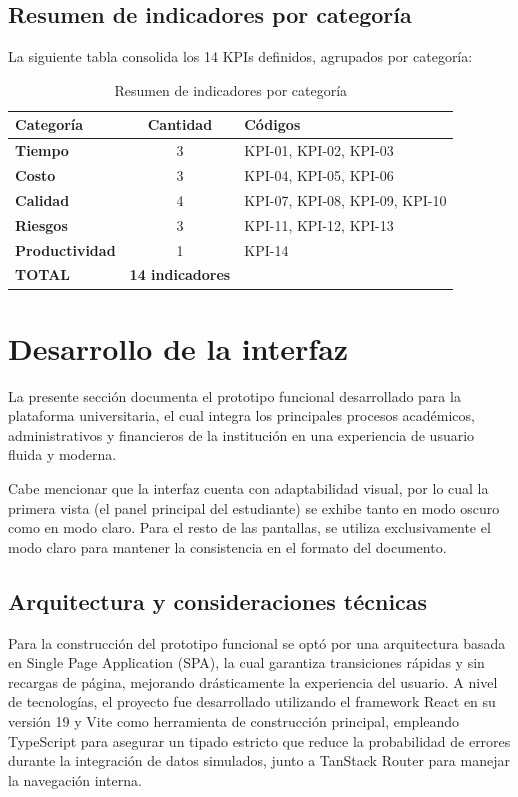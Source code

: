 \documentclass[11pt,spanish]{article}
\begin{document}
\subsection{Resumen de indicadores por categoría}

La siguiente tabla consolida los 14 KPIs definidos, agrupados por categoría:

\begin{table}[H]
\centering
\small
\caption{Resumen de indicadores por categoría}\label{tab:resumen-indicadores}
\begin{tabular}{l c l}
\toprule
\textbf{Categoría} & \textbf{Cantidad} & \textbf{Códigos} \\
\midrule
\textbf{Tiempo} & 3 & KPI-01, KPI-02, KPI-03 \\
\textbf{Costo} & 3 & KPI-04, KPI-05, KPI-06 \\
\textbf{Calidad} & 4 & KPI-07, KPI-08, KPI-09, KPI-10 \\
\textbf{Riesgos} & 3 & KPI-11, KPI-12, KPI-13 \\
\textbf{Productividad} & 1 & KPI-14 \\
\midrule
\textbf{TOTAL} & \textbf{14 indicadores} & \\
\bottomrule
\end{tabular}
\end{table}

\newpage
\section{Desarrollo de la interfaz}

La presente sección documenta el prototipo funcional desarrollado para la plataforma universitaria, el cual integra los principales procesos académicos, administrativos y financieros de la institución en una experiencia de usuario fluida y moderna.

Cabe mencionar que la interfaz cuenta con adaptabilidad visual, por lo cual la primera vista (el panel principal del estudiante) se exhibe tanto en modo oscuro como en modo claro. Para el resto de las pantallas, se utiliza exclusivamente el modo claro para mantener la consistencia en el formato del documento.

\subsection{Arquitectura y consideraciones técnicas}

Para la construcción del prototipo funcional se optó por una arquitectura basada en Single Page Application (SPA), la cual garantiza transiciones rápidas y sin recargas de página, mejorando drásticamente la experiencia del usuario. A nivel de tecnologías, el proyecto fue desarrollado utilizando el framework React en su versión 19 y Vite como herramienta de construcción principal, empleando TypeScript para asegurar un tipado estricto que reduce la probabilidad de errores durante la integración de datos simulados, junto a TanStack Router para manejar la navegación interna.
\end{document}
